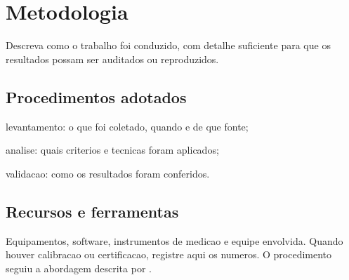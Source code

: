 \chapter{Metodologia}
\label{cap:metodologia}

Descreva como o trabalho foi conduzido, com detalhe suficiente para que os
resultados possam ser auditados ou reproduzidos.

\section{Procedimentos adotados}
\label{sec:procedimentos}

\begin{alineas}
  \item levantamento: o que foi coletado, quando e de que fonte;
  \item analise: quais criterios e tecnicas foram aplicados;
  \item validacao: como os resultados foram conferidos.
\end{alineas}

\section{Recursos e ferramentas}
\label{sec:recursos}

Equipamentos, software, instrumentos de medicao e equipe envolvida. Quando
houver calibracao ou certificacao, registre aqui os numeros. O procedimento
seguiu a abordagem descrita por .

%
